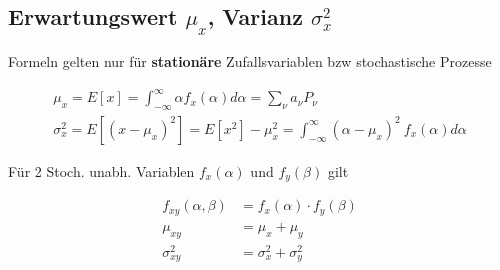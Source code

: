 \documentclass[10pt,a4paper]{article}
\begin{document}
\subsection{Erwartungswert $\mu_x$, Varianz $\sigma_x^2$}
Formeln gelten nur für \textbf{stationäre} Zufallsvariablen bzw stochastische Prozesse
  \begin{mdframed}[style=exercise]
    \begin{align}
        \mu_x = E[x] = \displaystyle\int_{-\infty}^{\infty} \alpha f_x(\alpha) d\alpha = \displaystyle\sum_{\nu}^{} a_\nu P_\nu\\
        \sigma_x^2 = E[(x-\mu_x)^2] = E[x^2]-\mu_x^2  = \displaystyle\int_{-\infty}^{\infty} (\alpha-\mu_x)^2 \ f_x(\alpha) d\alpha
    \end{align}
  \end{mdframed}
Für 2 Stoch. unabh. Variablen $f_x(\alpha)$ und $f_y(\beta)$ gilt
  \begin{mdframed}[style=exercise]
    \begin{align}
        f_{xy}(\alpha,\beta) &= f_x(\alpha)\cdot f_y(\beta)\\
        \mu_{xy} &= \mu_{x} + \mu_{y}\\
        \sigma_{xy}^2 &= \sigma_{x}^2 + \sigma_{y}^2
    \end{align}
  \end{mdframed}
%
\end{document}
